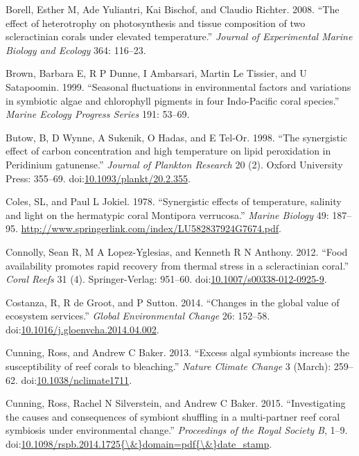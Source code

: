 \documentclass[]{elsarticle} %
\begin{document}
\hypertarget{ref-Borell:2008p108}{}
Borell, Esther M, Ade Yuliantri, Kai Bischof, and Claudio Richter. 2008.
``The effect of heterotrophy on photosynthesis and tissue composition of
two scleractinian corals under elevated temperature.'' \emph{Journal of
Experimental Marine Biology and Ecology} 364: 116--23.

\hypertarget{ref-Brown:1999p3534}{}
Brown, Barbara E, R P Dunne, I Ambarsari, Martin Le Tissier, and U
Satapoomin. 1999. ``Seasonal fluctuations in environmental factors and
variations in symbiotic algae and chlorophyll pigments in four
Indo-Pacific coral species.'' \emph{Marine Ecology Progress Series} 191:
53--69.

\hypertarget{ref-Butow:1998gz}{}
Butow, B, D Wynne, A Sukenik, O Hadas, and E Tel-Or. 1998. ``The
synergistic effect of carbon concentration and high temperature on lipid
peroxidation in Peridinium gatunense.'' \emph{Journal of Plankton
Research} 20 (2). Oxford University Press: 355--69.
doi:\href{https://doi.org/10.1093/plankt/20.2.355}{10.1093/plankt/20.2.355}.

\hypertarget{ref-Coles:1978p1124}{}
Coles, SL, and Paul L Jokiel. 1978. ``Synergistic effects of
temperature, salinity and light on the hermatypic coral Montipora
verrucosa.'' \emph{Marine Biology} 49: 187--95.
\url{http://www.springerlink.com/index/LU582837924G7674.pdf}.

\hypertarget{ref-Connolly:2012ep}{}
Connolly, Sean R, M A Lopez-Yglesias, and Kenneth R N Anthony. 2012.
``Food availability promotes rapid recovery from thermal stress in a
scleractinian coral.'' \emph{Coral Reefs} 31 (4). Springer-Verlag:
951--60.
doi:\href{https://doi.org/10.1007/s00338-012-0925-9}{10.1007/s00338-012-0925-9}.

\hypertarget{ref-Costanza:2014ex}{}
Costanza, R, R de Groot, and P Sutton. 2014. ``Changes in the global
value of ecosystem services.'' \emph{Global Environmental Change} 26:
152--58.
doi:\href{https://doi.org/10.1016/j.gloenvcha.2014.04.002}{10.1016/j.gloenvcha.2014.04.002}.

\hypertarget{ref-Cunning:2013gp}{}
Cunning, Ross, and Andrew C Baker. 2013. ``Excess algal symbionts
increase the susceptibility of reef corals to bleaching.'' \emph{Nature
Climate Change} 3 (March): 259--62.
doi:\href{https://doi.org/10.1038/nclimate1711}{10.1038/nclimate1711}.

\hypertarget{ref-Cunning:2015ja}{}
Cunning, Ross, Rachel N Silverstein, and Andrew C Baker. 2015.
``Investigating the causes and consequences of symbiont shuffling in a
multi-partner reef coral symbiosis under environmental change.''
\emph{Proceedings of the Royal Society B}, 1--9.
doi:\href{https://doi.org/10.1098/rspb.2014.1725\%7B/\&\%7Ddomain=pdf\%7B/\&\%7Ddate_stamp}{10.1098/rspb.2014.1725\{\textbackslash{}\&\}domain=pdf\{\textbackslash{}\&\}date\_stamp}.
\end{document}
